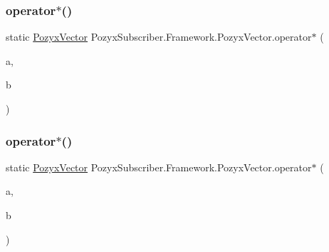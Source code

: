 \subsubsection{\texorpdfstring{operator$\ast$()}{operator*()}\hspace{0.1cm}{\footnotesize\ttfamily [1/2]}}
{\footnotesize\ttfamily static \hyperlink{struct_pozyx_subscriber_1_1_framework_1_1_pozyx_vector}{Pozyx\+Vector} Pozyx\+Subscriber.\+Framework.\+Pozyx\+Vector.\+operator$\ast$ (\begin{DoxyParamCaption}\item[{\hyperlink{struct_pozyx_subscriber_1_1_framework_1_1_pozyx_vector}{Pozyx\+Vector}}]{a,  }\item[{\hyperlink{struct_pozyx_subscriber_1_1_framework_1_1_pozyx_vector}{Pozyx\+Vector}}]{b }\end{DoxyParamCaption})\hspace{0.3cm}{\ttfamily [static]}}

\mbox{\label{struct_pozyx_subscriber_1_1_framework_1_1_pozyx_vector_ab1b621d997bd4ec029ddec8869b6248e}} 
\subsubsection{\texorpdfstring{operator$\ast$()}{operator*()}\hspace{0.1cm}{\footnotesize\ttfamily [2/2]}}
{\footnotesize\ttfamily static \hyperlink{struct_pozyx_subscriber_1_1_framework_1_1_pozyx_vector}{Pozyx\+Vector} Pozyx\+Subscriber.\+Framework.\+Pozyx\+Vector.\+operator$\ast$ (\begin{DoxyParamCaption}\item[{\hyperlink{struct_pozyx_subscriber_1_1_framework_1_1_pozyx_vector}{Pozyx\+Vector}}]{a,  }\item[{float}]{b }\end{DoxyParamCaption})\hspace{0.3cm}{\ttfamily [static]}}

\mbox{\label{struct_pozyx_subscriber_1_1_framework_1_1_pozyx_vector_ad9217e4f7c748ebbcd005656bbb15c07}} 

